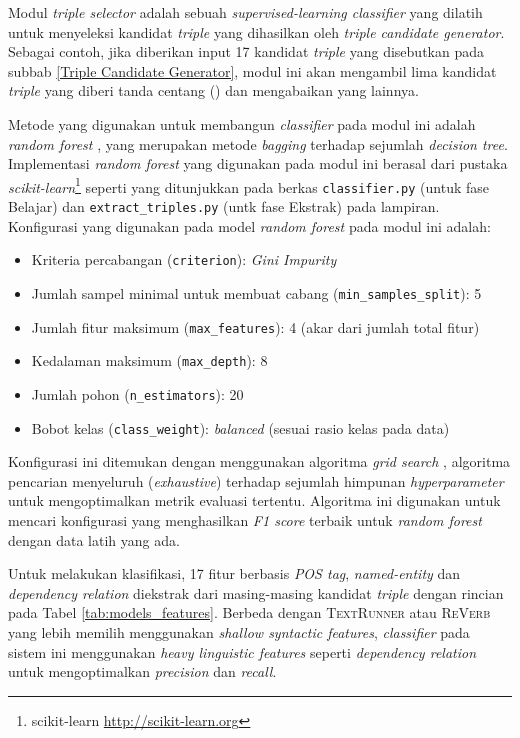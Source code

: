 Modul \textit{triple selector} adalah sebuah \textit{supervised-learning classifier} yang dilatih untuk menyeleksi kandidat \textit{triple} yang dihasilkan oleh \textit{triple candidate generator}. Sebagai contoh, jika diberikan input 17 kandidat \textit{triple} yang disebutkan pada subbab \ref{Triple Candidate Generator}, modul ini akan mengambil lima kandidat \textit{triple} yang diberi tanda centang () dan mengabaikan yang lainnya.

Metode yang digunakan untuk membangun \textit{classifier} pada modul ini adalah \textit{random forest} \citep{breiman2001random}, yang merupakan metode \textit{bagging} terhadap sejumlah \textit{decision tree}. Implementasi \textit{random forest} yang digunakan pada modul ini berasal dari pustaka \textit{scikit-learn}\footnote{scikit-learn \url{http://scikit-learn.org}} seperti yang ditunjukkan pada berkas \verb|classifier.py| (untuk fase Belajar) dan \verb|extract_triples.py| (untk fase Ekstrak) pada lampiran. Konfigurasi yang digunakan pada model \textit{random forest} pada modul ini adalah:

\begin{itemize}
\item Kriteria percabangan (\verb|criterion|): \textit{Gini Impurity}
\item Jumlah sampel minimal untuk membuat cabang  (\verb|min_samples_split|): 5
\item Jumlah fitur maksimum  (\verb|max_features|): 4 (akar dari jumlah total fitur)
\item Kedalaman maksimum  (\verb|max_depth|): 8
\item Jumlah pohon (\verb|n_estimators|): 20
\item Bobot kelas (\verb|class_weight|): \textit{balanced} (sesuai rasio kelas pada data)
\end{itemize}

Konfigurasi ini ditemukan dengan menggunakan algoritma \textit{grid search} \citep{wasserman2015grid}, algoritma pencarian menyeluruh (\textit{exhaustive}) terhadap sejumlah himpunan \textit{hyperparameter} untuk mengoptimalkan metrik evaluasi tertentu. Algoritma ini digunakan untuk mencari konfigurasi yang menghasilkan \textit{F1 score} terbaik untuk \textit{random forest} dengan data latih yang ada.

Untuk melakukan klasifikasi, 17 fitur berbasis \textit{POS tag}, \textit{named-entity} dan \textit{dependency relation} diekstrak dari masing-masing kandidat \textit{triple} dengan rincian pada Tabel \ref{tab:models_features}. Berbeda dengan \textsc{TextRunner} atau \textsc{ReVerb} \citep{banko2007open} \citep{etzioni2011open} yang lebih memilih menggunakan \textit{shallow syntactic features}, \textit{classifier} pada sistem ini menggunakan \textit{heavy linguistic features} seperti \textit{dependency relation} untuk mengoptimalkan \textit{precision} dan \textit{recall}.

